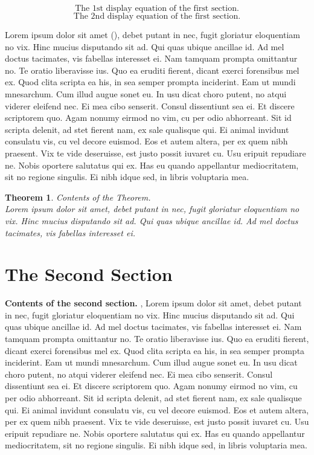 \documentclass[12pt]{article} %
\newtheorem{theorem}{Theorem}
\theoremstyle{definition}
\begin{document}
	\par
	
	\begin{equation}\label{1.1}
	\mbox {The 1st display equation of the first section.}
	\end{equation}
	\begin{equation}\label{1.2}
	\mbox {The 2nd display equation of the first section.}
	\end{equation}
	
	
	Lorem ipsum dolor sit amet (\citet{Noakes, Eubank}), debet putant in nec, fugit gloriatur eloquentiam no vix. Hinc mucius disputando sit ad. Qui quas ubique ancillae id. Ad mel doctus tacimates, vis fabellas interesset ei.
	Nam tamquam prompta omittantur no. Te oratio liberavisse ius. Quo ea eruditi fierent, dicant exerci forensibus mel ex. Quod clita scripta ea his, in sea semper prompta inciderint. Eam ut mundi mnesarchum. Cum illud augue sonet eu.
	In usu dicat choro putent, no atqui viderer eleifend nec. Ei mea cibo senserit. Consul dissentiunt sea ei. Et discere scriptorem quo. Agam nonumy eirmod no vim, cu per odio abhorreant.
	Sit id scripta delenit, ad stet fierent nam, ex sale qualisque qui. Ei animal invidunt consulatu vis, cu vel decore euismod. Eos et autem altera, per ex quem nibh praesent. Vix te vide deseruisse, est justo possit iuvaret cu.
	Usu eripuit repudiare ne. Nobis oportere salutatus qui ex. Has eu quando appellantur mediocritatem, sit no regione singulis. Ei nibh idque sed, in libris voluptaria mea.
	\begin{theorem}
		Contents of the Theorem.\\
		Lorem ipsum dolor sit amet, debet putant in nec, fugit gloriatur eloquentiam no vix. Hinc mucius disputando sit ad. Qui quas ubique ancillae id. Ad mel doctus tacimates, vis fabellas interesset ei.
	\end{theorem}
	
	
	
	
	\section{The Second Section}
	{\bf Contents of the second section.}
	\cite{1943}, Lorem ipsum dolor sit amet, debet putant in nec, fugit gloriatur eloquentiam no vix. Hinc mucius disputando sit ad. Qui quas ubique ancillae id. Ad mel doctus tacimates, vis fabellas interesset ei.
	Nam tamquam prompta omittantur no. Te oratio liberavisse ius. Quo ea eruditi fierent, dicant exerci forensibus mel ex. Quod clita scripta ea his, in sea semper prompta inciderint. Eam ut mundi mnesarchum. Cum illud augue sonet eu.
	In usu dicat choro putent, no atqui viderer eleifend nec. Ei mea cibo senserit. Consul dissentiunt sea ei. Et discere scriptorem quo. Agam nonumy eirmod no vim, cu per odio abhorreant.
	Sit id scripta delenit, ad stet fierent nam, ex sale qualisque qui. Ei animal invidunt consulatu vis, cu vel decore euismod. Eos et autem altera, per ex quem nibh praesent. Vix te vide deseruisse, est justo possit iuvaret cu.
	Usu eripuit repudiare ne. Nobis oportere salutatus qui ex. Has eu quando appellantur mediocritatem, sit no regione singulis. Ei nibh idque sed, in libris voluptaria mea.
	
\end{document}
